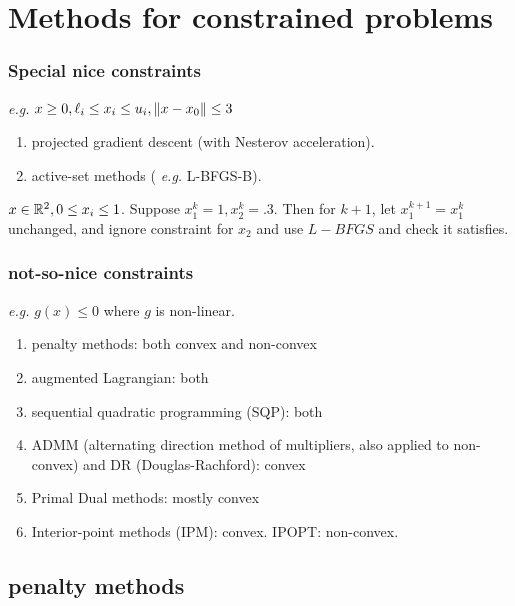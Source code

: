 \documentclass[class=article,crop=false]{standalone}
\begin{document}
\section{Methods for constrained problems}
\subsubsection{Special nice constraints }
\emph{e.g.} $ x\geq 0, \ell_i \leq x_i \leq u_i, {\left\lVert{ x-x_0}\right\rVert}\leq 3 $
\begin{enumerate}[label=(\arabic*)]
	\item projected gradient descent (with Nesterov acceleration).
	\item active-set methods ( \emph{e.g.} L-BFGS-B).
\end{enumerate}
\begin{eg}
$ x \in \mathbb{R}^{2}, 0\leq x_i \leq 1$. Suppose $ x_1^{k} = 1, x_2^{k} = .3 $. Then for $ k+1$, let  $ x_1^{k+1} = x_1^{k}$ unchanged, and ignore constraint for $ x_2$ and use $ L-BFGS$ and check it satisfies.
\end{eg}

\subsubsection{not-so-nice constraints}
\emph{e.g.} $ g(x) \leq 0$ where $ g$ is non-linear.
 \begin{enumerate}[label=(\arabic*)]
	\item penalty methods: both convex and non-convex
	\item augmented Lagrangian: both
	\item sequential quadratic programming (SQP): both
	\item ADMM (alternating direction method of multipliers, also applied to non-convex) and DR (Douglas-Rachford): convex
	\item Primal Dual methods: mostly convex
	\item Interior-point methods (IPM): convex. IPOPT: non-convex.
\end{enumerate}

\subsection{penalty methods}
\end{document}
